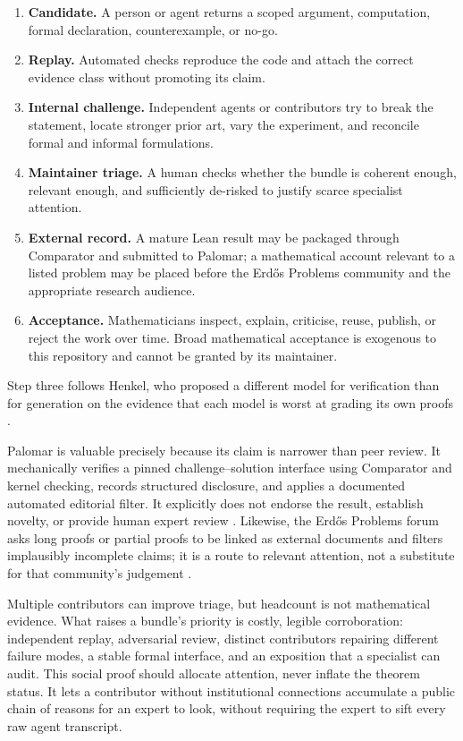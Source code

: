 \documentclass[10pt]{article}
\begin{document}
\begin{enumerate}
\item \textbf{Candidate.}  A person or agent returns a scoped argument,
      computation, formal declaration, counterexample, or no-go.
\item \textbf{Replay.}  Automated checks reproduce the code and attach the
      correct evidence class without promoting its claim.
\item \textbf{Internal challenge.}  Independent agents or contributors try
      to break the statement, locate stronger prior art, vary the experiment,
      and reconcile formal and informal formulations.
\item \textbf{Maintainer triage.}  A human checks whether the bundle is
      coherent enough, relevant enough, and sufficiently de-risked to justify
      scarce specialist attention.
\item \textbf{External record.}  A mature Lean result may be packaged through
      Comparator and submitted to Palomar; a mathematical account relevant to
      a listed problem may be placed before the Erd\H{o}s Problems community
      and the appropriate research audience.
\item \textbf{Acceptance.}  Mathematicians inspect, explain, criticise, reuse,
      publish, or reject the work over time.  Broad mathematical acceptance is
      exogenous to this repository and cannot be granted by its maintainer.
\end{enumerate}

Step three follows Henkel, who proposed a different model for verification
than for generation on the evidence that each model is worst at grading its
own proofs \cite{henkel,openproofcorpus}.

Palomar is valuable precisely because its claim is narrower than peer review.
It mechanically verifies a pinned challenge--solution interface using
Comparator and kernel checking, records structured disclosure, and applies a
documented automated editorial filter.  It explicitly does not endorse the
result, establish novelty, or provide human expert review \cite{palomar}.
Likewise, the Erd\H{o}s Problems forum asks long proofs or partial proofs to be
linked as external documents and filters implausibly incomplete claims; it is
a route to relevant attention, not a substitute for that community's
judgement \cite{erdosproblems}.

Multiple contributors can improve triage, but headcount is not mathematical
evidence.  What raises a bundle's priority is costly, legible corroboration:
independent replay, adversarial review, distinct contributors repairing
different failure modes, a stable formal interface, and an exposition that a
specialist can audit.  This social proof should allocate attention, never
inflate the theorem status.  It lets a contributor without institutional
connections accumulate a public chain of reasons for an expert to look,
without requiring the expert to sift every raw agent transcript.
\end{document}
